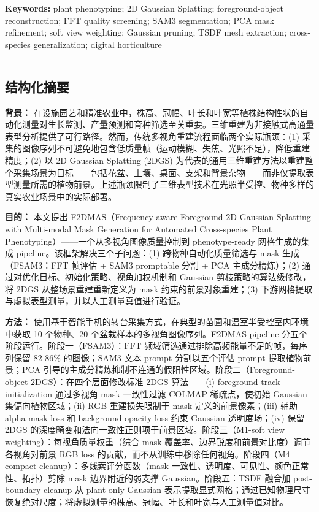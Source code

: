\documentclass[11pt,a4paper]{article}
\begin{document}
\textbf{Keywords:} plant phenotyping; 2D Gaussian Splatting;
foreground-object reconstruction; FFT quality screening; SAM3
segmentation; PCA mask refinement; soft view weighting; Gaussian
pruning; TSDF mesh extraction; cross-species generalization; digital
horticulture

\begin{center}\rule{0.5\linewidth}{0.5pt}\end{center}

\subsection{结构化摘要}\label{ux7ed3ux6784ux5316ux6458ux8981}

\textbf{背景：}
在设施园艺和精准农业中，株高、冠幅、叶长和叶宽等植株结构性状的自动化测量对生长监测、产量预测和育种筛选至关重要。三维重建为非接触式高通量表型分析提供了可行路径。然而，传统多视角重建流程面临两个实际瓶颈：(1)
采集的图像序列不可避免地包含低质量帧（运动模糊、失焦、光照不足），降低重建精度；(2)
以 2D Gaussian Splatting (2DGS)
为代表的通用三维重建方法以重建整个采集场景为目标------包括花盆、土壤、桌面、支架和背景杂物------而非仅提取表型测量所需的植物前景。上述瓶颈限制了三维表型技术在光照半受控、物种多样的真实农业场景中的实际部署。

\textbf{目的：} 本文提出 F2DMAS（Frequency-aware Foreground 2D Gaussian
Splatting with Multi-modal Mask Generation for Automated Cross-species
Plant Phenotyping）------一个从多视角图像质量控制到 phenotype-ready
网格生成的集成 pipeline。该框架解决三个子问题：(1)
跨物种自动化质量筛选与 mask 生成（FSAM3：FFT 帧评估 + SAM3 promptable
分割 + PCA 主成分精炼）；(2) 通过对优化目标、初始化策略、视角加权机制和
Gaussian 剪枝策略的算法级修改，将 2DGS 从整场景重建重新定义为 mask
约束的前景对象重建；(3)
下游网格提取与虚拟表型测量，并以人工测量真值进行验证。

\textbf{方法：}
使用基于智能手机的转台采集方式，在典型的苗圃和温室半受控室内环境中获取
10 个物种、20 个盆栽样本的多视角图像序列。F2DMAS pipeline
分五个阶段运行。阶段一（FSAM3）：FFT
频域筛选通过排除高频能量不足的帧，每序列保留 82-86\% 的图像；SAM3 文本
prompt 分割以五个评估 prompt 提取植物前景；PCA
引导的主成分精炼抑制不连通的假阳性区域。阶段二（Foreground-object
2DGS）：在四个层面修改标准 2DGS 算法------(i) foreground track
initialization 通过多视角 mask 一致性过滤 COLMAP 稀疏点，使初始 Gaussian
集偏向植物区域；(ii) RGB 重建损失限制于 mask 定义的前景像素；(iii) 辅助
alpha mask loss 和 background opacity loss 约束 Gaussian 透明度场；(iv)
保留 2DGS 的深度畸变和法向一致性正则项于前景区域。阶段三（M1-soft view
weighting）：每视角质量权重（综合 mask
覆盖率、边界锐度和前景对比度）调节各视角对前景 RGB loss
的贡献，而不从训练中移除任何视角。阶段四（M4 compact
cleanup）：多线索评分函数（mask
一致性、透明度、可见性、颜色正常性、拓扑）剪除 mask 边界附近的弱支撑
Gaussian。阶段五：TSDF 融合加 post-boundary cleanup 从 plant-only
Gaussian
表示提取显式网格；通过已知物理尺寸恢复绝对尺度；将虚拟测量的株高、冠幅、叶长和叶宽与人工测量值对比。
\end{document}
